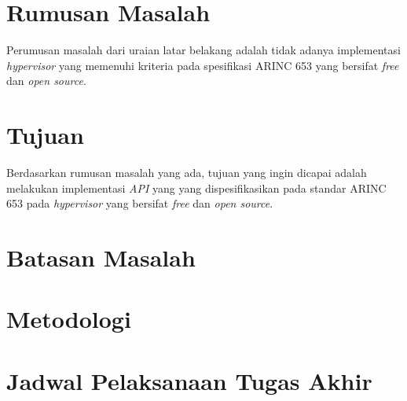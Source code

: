 \section{Rumusan Masalah}

Perumusan masalah dari uraian latar belakang adalah tidak adanya implementasi \textit{hypervisor} yang memenuhi kriteria
pada spesifikasi ARINC 653 yang bersifat \textit{free} dan \textit{open source}.

\section{Tujuan}

Berdasarkan rumusan masalah yang ada, tujuan yang ingin dicapai adalah melakukan implementasi \textit{API} yang
yang dispesifikasikan pada standar ARINC 653 pada \textit{hypervisor} yang bersifat \textit{free} dan \textit{open
source}.

\section{Batasan Masalah}


\section{Metodologi}


\section{Jadwal Pelaksanaan Tugas Akhir}

